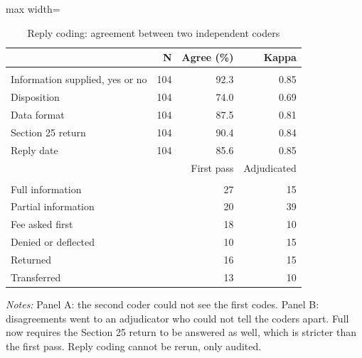 \begin{table}[!htbp]
\centering
\caption{Reply coding: agreement between two independent coders}
\label{tab:tab_coding}
\small
\begin{adjustbox}{max width=\textwidth}
\begin{threeparttable}
\begin{tabular}{lrrr}
\toprule
 & N & Agree (\%) & Kappa \\
\midrule
\addlinespace\multicolumn{4}{l}{\textit{Panel A. Agreement}} \\
Information supplied, yes or no & 104 & 92.3 & 0.85 \\
Disposition & 104 & 74.0 & 0.69 \\
Data format & 104 & 87.5 & 0.81 \\
Section 25 return & 104 & 90.4 & 0.84 \\
Reply date & 104 & 85.6 & 0.85 \\
\midrule
 &  & First pass & Adjudicated \\
\addlinespace\multicolumn{4}{l}{\textit{Panel B. Disposition counts}} \\
Full information &  & 27 & 15 \\
Partial information &  & 20 & 39 \\
Fee asked first &  & 18 & 10 \\
Denied or deflected &  & 10 & 15 \\
Returned &  & 16 & 15 \\
Transferred &  & 13 & 10 \\
\bottomrule
\end{tabular}
\begin{tablenotes}[flushleft]\footnotesize
\item \textit{Notes:} Panel A: the second coder could not see the first codes. Panel B: disagreements went to an adjudicator who could not tell the coders apart. Full now requires the Section 25 return to be answered as well, which is stricter than the first pass. Reply coding cannot be rerun, only audited.
\end{tablenotes}
\end{threeparttable}
\end{adjustbox}
\end{table}
